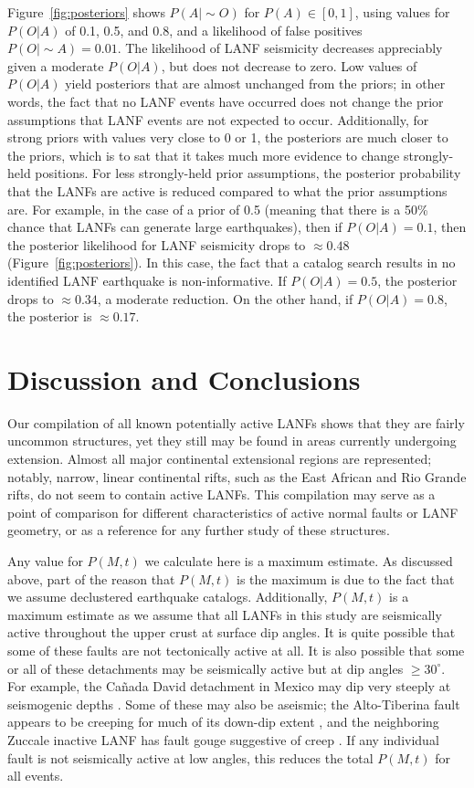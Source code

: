 \documentclass[draft,grl]{AGUTeX}
\begin{document}
\begin{article}
Figure~\ref{fig:posteriors} shows $P(A|\sim O)$ for $P(A) \in [0,1]$, using
values for $P(O|A)$ of 0.1, 0.5, and 0.8, and a likelihood of false positives
$P(O|\sim A)= 0.01$. The likelihood of LANF seismicity decreases appreciably
given a moderate $P(O|A)$, but does not decrease to zero. Low values of
$P(O|A)$ yield posteriors that are almost unchanged from the priors; in other
words, the fact that no LANF events have occurred does not change the prior
assumptions that LANF events are not expected to occur.  Additionally, for
strong priors with values very close to 0 or 1, the posteriors are much closer
to the priors, which is to sat that it takes much more evidence to change
strongly-held positions.  For less strongly-held prior assumptions, the
posterior probability that the LANFs are active is reduced compared to what the
prior assumptions are. For example, in the case of a prior of 0.5 (meaning that
there is a 50\% chance that LANFs can generate large earthquakes), then if
$P(O|A)=0.1$, then the posterior likelihood for LANF seismicity drops to
$\approx 0.48$ (Figure~\ref{fig:posteriors}). In this case, the fact that
a catalog search results in no identified LANF earthquake is 
non-informative. If $P(O|A)=0.5$, the posterior drops to $\approx 0.34$,
a moderate reduction.  On the other hand, if $P(O|A)=0.8$, the posterior is
$\approx 0.17$.

\section{Discussion and Conclusions}

Our compilation of all known potentially active LANFs shows that they are
fairly uncommon structures, yet they still may be found in areas currently
undergoing extension. Almost all major continental extensional regions are
represented; notably, narrow, linear continental rifts, such as the East
African and Rio Grande rifts, do not seem to contain active LANFs.  This
compilation may serve as a point of comparison for different characteristics of
active normal faults or LANF geometry, or as a reference for any further
study of these structures.

Any value for $P(M,t)$ we calculate here is a maximum estimate. As discussed
above, part of the reason that $P(M,t)$ is the maximum is due to the fact that we
assume declustered earthquake catalogs. Additionally, $P(M,t)$ is a maximum
estimate as we assume that all LANFs in this study are seismically active
throughout the upper crust at surface dip angles.  It is quite possible that
some of these faults are not tectonically active at all. It is also possible
that some or all of these detachments may be seismically active but at dip
angles $\ge30^\circ$.  For example, the Ca\~nada David detachment in Mexico may
dip very steeply at seismogenic depths \citep{fletcherspelz2009}.  Some of
these may also be aseismic; the Alto-Tiberina fault appears to be creeping for
much of its down-dip extent \citep{hreinsdottir2009altotib}, and the
neighboring Zuccale inactive LANF has fault gouge suggestive of creep
\citep{collettiniholdsworth2004}. If any individual fault is not seismically
active at low angles, this reduces the total $P(M, t)$ for all events.


\end{article}
\end{document}
